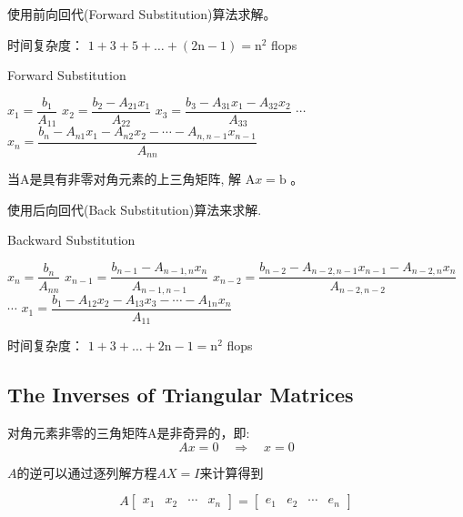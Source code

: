 使用前向回代(Forward Substitution)算法求解。

时间复杂度： $ 1+3+5+\ldots+(2 \mathrm{n}-1)=\mathrm{n}^{2} $ flops

\begin{algorithm}[htbp]
    \caption{Forward Substitution}
    $ x_{1}= \dfrac{b_{1} }{A_{11} }  $\;
$ x_{2}=\dfrac{b_{2}-A_{21} x_{1}}{A_{22}}$\;
$  x_{3} =\dfrac{b_{3}-A_{31} x_{1}-A_{32} x_{2}}{A_{33}} $ \;
    $\cdots$  \;
    $x_{n} =
    \dfrac{b_{n}-A_{n 1} x_{1}-A_{n 2} x_{2}-\cdots-A_{n, n-1} x_{n-1}}{A_{n n}} $\;
\end{algorithm}

\begin{problem}
    当A是具有非零对角元素的上三角矩阵, 解 $ \mathrm{A} x=\mathrm{b} $ 。
\end{problem}

使用后向回代(Back Substitution)算法来求解.

\begin{algorithm}[htbp]
    \caption{Backward Substitution}
    $ x_{n}= \dfrac{b_{n}}{A_{n n}} $\;
    $ x_{n-1}= \dfrac{b_{n-1}-A_{n-1, n} x_{n}}{A_{n-1, n-1}} $ \;
    $ x_{n-2}= \dfrac{b_{n-2}-A_{n-2, n-1} x_{n-1}-A_{n-2, n} x_{n}}{ A_{n-2, n-2}} $\;
    $\cdots$\;
    $ x_{1}=\dfrac{b_{1}-A_{12} x_{2}-A_{13} x_{3}-\cdots-A_{1 n} x_{n}}{A_{11}}  $\;
\end{algorithm}

时间复杂度： $ 1+3+\ldots+2 \mathrm{n}-1=\mathrm{n}^{2} $ flops

\subsection{The Inverses of Triangular Matrices}

\begin{theorem}
    对角元素非零的三角矩阵A是非奇异的，即:
$$
A x=0 \quad \Rightarrow \quad x=0
$$
\end{theorem}

\begin{theorem}[高斯消元法]
    $A$的逆可以通过逐列解方程$AX=I$来计算得到

    $$ A\left[\begin{array}{llll}x_{1} & x_{2} & \cdots & x_{n}\end{array}\right]=\left[\begin{array}{llll}e_{1} & e_{2} & \cdots & e_{n}\end{array}\right] $$
\end{theorem}

